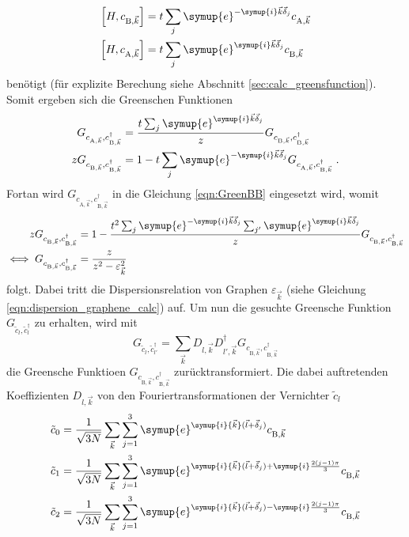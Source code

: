 \begin{align}
    \left [H,  c_{\text{B},\vec{k}} \right ] &= t \sum_j \symup{e}^{-\symup{i}\vec{k}\vec{\delta}_j} c_{\text{A},\vec{k}} \label{eqn:test} \\
    \left [H,  c_{\text{A},\vec{k}} \right ] &= t \sum_j \symup{e}^{\symup{i}\vec{k}\vec{\delta}_j} c_{\text{B},\vec{k}}
\end{align}
benötigt (für explizite Berechung siehe Abschnitt \ref{sec:calc_greensfunction}).
Somit ergeben sich die Greenschen Funktionen
\begin{align}
    G_{c_{\text{A},\vec{k}}, c^\dagger_{\text{B},\vec{k}}} &=  \frac{t\sum_j \symup{e}^{\symup{i}\vec{k}\vec{\delta}_j}}{z} G_{c_{\text{B},\vec{k}}, c^\dagger_{\text{B},\vec{k}}}\\
    zG_{c_{\text{B},\vec{k}}, c^\dagger_{\text{B},\vec{k}}} &= 1 -  t\sum_j \symup{e}^{-\symup{i}\vec{k}\vec{\delta}_j} G_{c_{\text{A},\vec{k}}, c^\dagger_{\text{B},\vec{k}}} \; . \label{eqn:GreenBB}
\end{align}
Fortan wird $G_{c_{\text{A},\vec{k}}, c^\dagger_{\text{B},\vec{k}}}$ in die Gleichung \eqref{eqn:GreenBB} eingesetzt wird, womit
\begin{align}
    zG_{c_{\text{B},\vec{k}}, c^\dagger_{\text{B},\vec{k}}} &= 1 - \frac{t^2\sum_j \symup{e}^{-\symup{i}\vec{k}\vec{\delta}_j} \sum_{j'} \symup{e}^{\symup{i}\vec{k}\vec{\delta}_{j}} }{z} G_{c_{\text{B},\vec{k}}, c^\dagger_{\text{B},\vec{k}}} \\
    \iff G_{c_{\text{B},\vec{k}}, c^\dagger_{\text{B},\vec{k}}} &= \frac{z}{z^2 - \varepsilon^2_{\vec{k}}  } \; 
\end{align}
folgt. 
Dabei tritt die Dispersionsrelation von Graphen $\varepsilon_{\vec{k}}$ (siehe Gleichung \eqref{eqn:dispersion_graphene_calc}) auf. 
Um nun die gesuchte Greensche Funktion $G_{\tilde{c}_l, \tilde{c}_l^{\dagger}}$ zu erhalten, wird mit 
\begin{equation}
    G_{\tilde{c}_l, \tilde{c}^\dagger_{l'}} = \sum_{\vec{k}} D_{l,\vec{k}} D^\dagger_{l',\vec{k}}G_{c_{\text{B},\vec{k}}, c^\dagger_{\text{B},\vec{k}}} \label{eqn:koe}
\end{equation}
die Greensche Funktioen $G_{c_{\text{B},\vec{k}}, c^\dagger_{\text{B},\vec{k}}}$ zurücktransformiert.
Die dabei auftretenden Koeffizienten $D_{l,\vec{k}}$ von den Fouriertransformationen der Vernichter $\tilde{c}_l$
\begin{align*}
    \tilde{c}_0 &= \frac{1}{\sqrt{3N}}\sum_{\vec{k}} \sum_{j=1}^3\symup{e}^{\symup{i}{\vec{k}}(\vec{l}+\vec{\delta}_j)}                              c_{\text{B}, \vec{k}}  \\
    \tilde{c}_1 &= \frac{1}{\sqrt{3N}}\sum_{\vec{k}} \sum_{j=1}^3\symup{e}^{\symup{i}{\vec{k}}(\vec{l}+\vec{\delta}_j)+\symup{i}\frac{2(j-1)\pi}{3}} c_{\text{B}, \vec{k}}  \\
    \tilde{c}_2 &= \frac{1}{\sqrt{3N}}\sum_{\vec{k}} \sum_{j=1}^3\symup{e}^{\symup{i}{\vec{k}}(\vec{l}+\vec{\delta}_j)-\symup{i}\frac{2(j-1)\pi}{3}} c_{\text{B}, \vec{k}}  
\end{align*}
